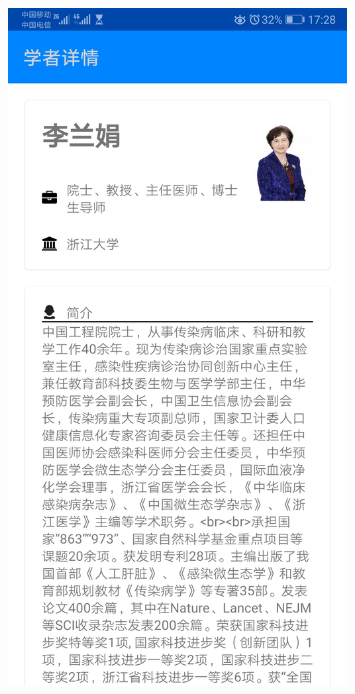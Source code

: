 \documentclass[UTF8]{article}
\begin{document}
\begin{figure}[htbp]
{\begin{minipage}[t]{0.25\linewidth}
    \includegraphics[width=0.8\textwidth]{scholar3}
    \end{minipage}%
    }%
\end{figure}
\end{document}
